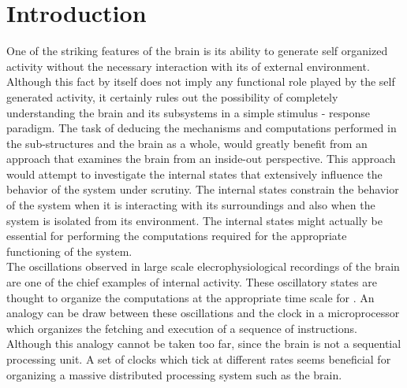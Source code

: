 \chapter{Introduction} 

\label{intro}

One  of the striking features of the brain is its ability to generate self organized activity without the necessary interaction with its of external environment. Although this fact by itself does not imply any functional role played by the self generated activity, it certainly rules out the possibility of completely understanding the brain and its subsystems in a simple stimulus - response paradigm. The task of deducing the mechanisms and computations performed in the sub-structures and  the brain as a whole, would greatly benefit from an approach that examines the brain from an inside-out perspective. This approach would attempt to investigate the internal states that extensively influence the behavior of the system under scrutiny. The internal states constrain the behavior of the system when it is interacting with its surroundings and also when the system is isolated from its environment. The internal states might actually be essential for performing the computations required for the appropriate functioning of the system. \\

The oscillations observed in large scale elecrophysiological recordings of the brain are one of the chief examples of internal  activity. These oscillatory states are thought to organize the computations at the appropriate time scale for . An analogy can be draw between these oscillations and the clock in a microprocessor which organizes the fetching and execution of a sequence of instructions. Although this analogy cannot be taken too far, since the brain is not a sequential processing unit. A set of clocks which tick at different rates seems beneficial for organizing a massive distributed processing system such as the brain. \\

